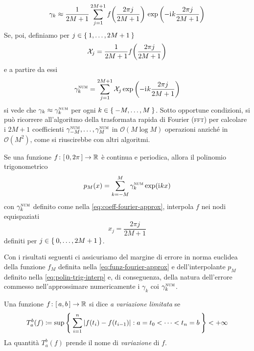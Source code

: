	\begin{equation}
		\gamma_k \approx \frac{1}{2 M + 1} \sum_{j = 1}^{2 M + 1} f \qty(\frac{2 \pi j}{2 M + 1}) \, \exp \qty(- \mathrm{i}\mkern1mu k \frac{2 \pi j}{2 M + 1})
	\end{equation}
	Se, poi, definiamo per \(j \in \Set{1, \dots, 2 M + 1}\)
	\begin{equation*}
		\mathcal{X}_j = \frac{1}{2 M + 1} f \qty(\frac{2 \pi j}{2 M + 1})
	\end{equation*}
	e a partire da essi
	\begin{equation}\label{eq:coeff-fourier-approx}
		\gamma_{k}^{\textup{\textsc{num}}} = \sum_{j = 1}^{2 M + 1} \mathcal{X}_j \exp \qty(- \mathrm{i}\mkern1mu k \frac{2 \pi j}{2 M + 1})
	\end{equation}
	si vede che \(\gamma_k \approx \gamma_{k}^{\textup{\textsc{num}}}\) per ogni \(k \in \Set{-M, \dots, M}\). Sotto opportune condizioni, si può ricorrere all'algoritmo della trasformata rapida di Fourier (\textsc{fft}) per calcolare i \(2 M + 1\) coefficienti \(\gamma_{-M}^{\textup{\textsc{num}}}, \dots, \gamma_{M}^{\textup{\textsc{num}}}\) in \(\mathcal{O} (M \log M)\) operazioni anziché in \(\mathcal{O} (M^2)\), come si riuscirebbe con altri algoritmi.
	
	\begin{teorema}\label{th:polin-trig-interp}
		Se una funzione \(f \colon [\, 0, 2 \pi \,] \to \mathbb{R}\) è continua e periodica, allora il polinomio trigonometrico
		\begin{equation}\label{eq:polin-trig-interp}
			p_M (x) = \sum_{k = - M}^M \gamma_{k}^{\textup{\textsc{num}}} \exp(\mathrm{i}\mkern1mu k x)
		\end{equation}
		con \(\gamma_{k}^{\textup{\textsc{num}}}\) definito come nella \eqref{eq:coeff-fourier-approx}, interpola \(f\) nei nodi equispaziati
		\begin{equation*}
			x_j = \frac{2 \pi j}{2 M + 1}
		\end{equation*}
		definiti per \(j \in \Set{0, \dots, 2 M + 1}\).
	\end{teorema}

	Con i risultati seguenti ci assicuriamo del margine di errore in norma euclidea della funzione \(f_M\) definita nella \eqref{eq:funz-fourier-approx} e dell'interpolante \(p_M\) definito nella \eqref{eq:polin-trig-interp} e, di conseguenza, della natura dell'errore commesso nell'approssimare numericamente i \(\gamma_k\) coi \(\gamma_{k}^{\textup{\textsc{num}}}\).
	
	\begin{definizione}\label{def:variaz-limit}
		Una funzione \(f \colon [\, a, b \,] \to \mathbb{R}\) si dice \emph{a variazione limitata} se
		\begin{equation}
			T_a^b (f) \coloneqq \sup \Set{\sum_{i = 1}^n \abs{f (t_i) - f (t_{i - 1})} : a = t_0 < \dots < t_n = b} < + \infty
		\end{equation}
		La quantità \(T_a^b (f)\) prende il nome di \emph{variazione} di \(f\).
	\end{definizione}

